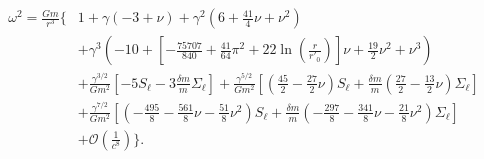 \begin{align}
\label{omega2ofgamma}
\omega^2=\frac{G m}{r^3}\Bigg\{&
1
+\gamma \left(-3+\nu\right)
+\gamma^2 \left(6 + \frac{41}{4} \nu + \nu^2\right)\nonumber\\
&+\gamma^3 \left( 
-10+\left[-\frac{75707}{840}+\frac{41}{64}\pi^2+22\ln\left(\frac{r}{r'_0}\right)\right]\nu + \frac{19}{2} \nu^2 + \nu^3\right) \nonumber\\
&+\frac{\gamma^{3/2}}{G m^2} \left[-5S_\ell-3\frac{\delta m}{m}\Sigma _\ell\right]
+\frac{\gamma^{5/2}}{G m^2} \left[\left(\frac{45}{2} -\frac{27}{2} \nu\right)S_\ell+\frac{\delta m}{m}\left(\frac{27}{2} -\frac{13}{2} \nu\right)\Sigma _\ell\right]\nonumber\\
&+\frac{\gamma^{7/2}}{G m^2} \left[\left(-\frac{495}{8} -\frac{561}{8} \nu -\frac{51}{8} \nu^2\right)S_\ell+\frac{\delta m}{m}\left(-\frac{297}{8} -\frac{341}{8} \nu -\frac{21}{8} \nu^2\right)\Sigma _\ell\right]\nonumber\\
&+\mathcal{O}\left(\frac{1}{c^8}\right)
\Bigg\}.
\end{align}